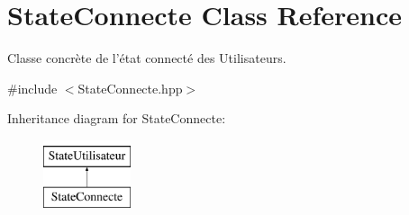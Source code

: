 \hypertarget{classStateConnecte}{\section{State\-Connecte Class Reference}
\label{classStateConnecte}
}


Classe concrète de l'état connecté des Utilisateurs.  




{\ttfamily \#include $<$State\-Connecte.\-hpp$>$}

Inheritance diagram for State\-Connecte\-:\begin{figure}[H]
\begin{center}
\leavevmode
\includegraphics[height=2.000000cm]{classStateConnecte}
\end{center}
\end{figure}
